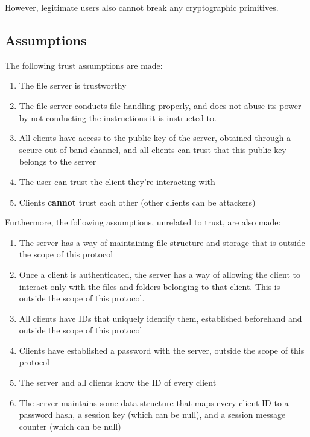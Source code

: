 \documentclass[12pt]{article}
\begin{document}
\noindent However, legitimate users also cannot break any cryptographic primitives.

\subsection{Assumptions}

The following trust assumptions are made:

\begin{enumerate}
    \item The file server is trustworthy
    \item The file server conducts file handling properly, and does not abuse its power by not conducting the instructions it is instructed to.
    \item All clients have access to the public key of the server, obtained through a secure out-of-band channel, and all clients can trust that this public key belongs to the server
    \item The user can trust the client they’re interacting with
    \item Clients \textbf{cannot} trust each other (other clients can be attackers)
\end{enumerate}

\noindent Furthermore, the following assumptions, unrelated to trust, are also made:

\begin{enumerate}
    \item The server has a way of maintaining file structure and storage that is outside the scope of this protocol
    \item Once a client is authenticated, the server has a way of allowing the client to interact only with the files and folders belonging to that client. This is outside the scope of this protocol.
    \item All clients have IDs that uniquely identify them, established beforehand and outside the scope of this protocol
    \item Clients have established a password with the server, outside the scope of this protocol
    \item The server and all clients know the ID of every client
    \item The server maintains some data structure that maps every client ID to a password hash, a session key (which can be null), and a session message counter (which can be null)
\end{enumerate}
\end{document}
